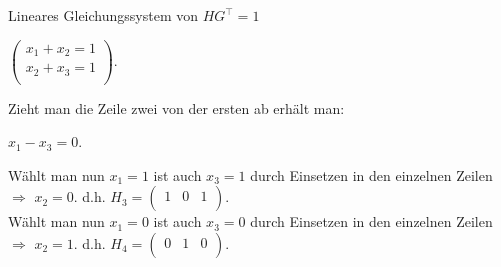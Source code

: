\begin{Beispiel}
    Lineares Gleichungssystem von $HG^\intercal = 1$ 
    
    $\left( \begin{array}{rrr}
    x_1+x_2 = 1 \\
    x_2+x_3 = 1 \\
    \end{array}\right).
    $
    
    Zieht man die Zeile zwei von der ersten ab erhält man:
    
    
    $x_1-x_3 = 0$.
    
    Wählt man nun $x_1 = 1$ ist auch $x_3 = 1$  durch Einsetzen in den einzelnen Zeilen $\Rightarrow$ $x_2 = 0$.
    d.h. 
    $H_3=\left( \begin{array}{rrr}
              1 & 0 & 1 \\
             \end{array}\right).
    $
    \\
    
    Wählt man nun $x_1 = 0$ ist auch $x_3 = 0$  durch Einsetzen in den einzelnen Zeilen $\Rightarrow$ $x_2 = 1$.
    d.h. 
    $H_4=\left( \begin{array}{rrr}
              0 & 1 & 0 \\
             \end{array}\right).
    $
    \\
    \end{Beispiel}
    
